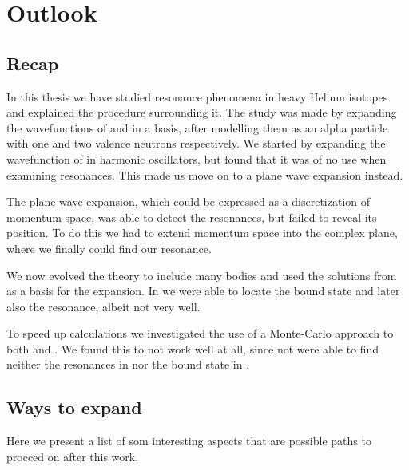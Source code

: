 \documentclass[../main/report.tex]{subfiles}
\begin{document}
\chapter{Outlook}
\label{cha:outlook}

\section{Recap}
In this thesis we have studied resonance phenomena in heavy Helium isotopes and explained the procedure surrounding it.
The study was made by expanding the wavefunctions of  and  in a basis, after modelling them as an alpha particle with one and two valence neutrons respectively.
We started by expanding the wavefunction of  in harmonic oscillators, but found that it was of no use when examining resonances.
This made us move on to a plane wave expansion instead.

The plane wave expansion, which could be expressed as a discretization of momentum space, was able to detect the resonances, but failed to reveal its position.
To do this we had to extend momentum space into the complex plane, where we finally could find our resonance.

We now evolved the theory to include many bodies and used the solutions from  as a basis for the  expansion.
In  we were able to locate the bound state and later also the resonance, albeit not very well.

To speed up calculations we investigated the use of a Monte-Carlo approach to both  and .
We found this to not work well at all, since not were able to find neither the resonances in  nor the bound state in .


\section{Ways to expand}
Here we present a list of som interesting aspects that are possible paths to procced on after this work.
\end{document}
